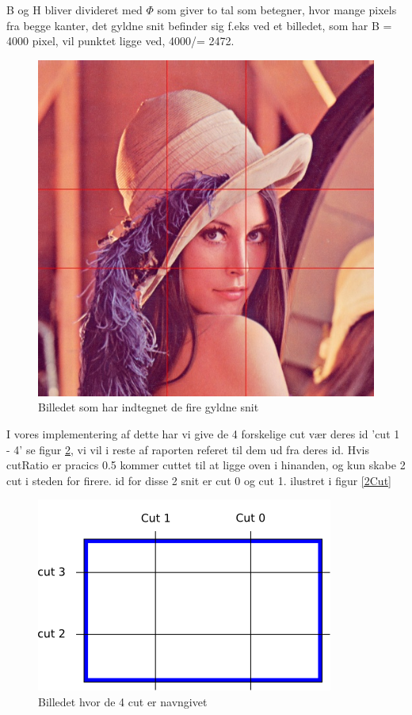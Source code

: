 B og H bliver divideret med $\varPhi$ som giver to tal som betegner, hvor
mange pixels fra begge kanter, det gyldne snit befinder sig f.eks ved et
billedet, som har B = 4000 pixel, vil punktet ligge ved, 4000/\varPhi = 2472.
\begin{figure}[h]
	\begin{center}
		\includegraphics[scale=0.42,angle=0]{afsnit/vores_implementation/billeder/naiv_algoritme/Lenagolden}
	\end{center}
	\caption[]{Billedet som har indtegnet de fire gyldne snit}
	\label{lenasnit2}
\end{figure}

I vores implementering af dette har vi give de 4 forskelige cut vær
deres id 'cut 1 - 4' se figur \ref{cut}, vi vil i reste af raporten
referet til dem ud fra deres id. Hvis cutRatio er pracics 0.5 kommer cuttet til at ligge oven i hinanden,
og kun skabe 2 cut i steden for firere. id for disse 2 snit er cut 0 og
cut 1. ilustret i figur \ref{2Cut}

\begin{figure}[h]
	\begin{center}
		\includegraphics[scale=0.42,angle=0]{afsnit/vores_implementation/billeder/naiv_algoritme/Cut}
	\end{center}
	\caption[]{Billedet hvor de 4 cut er navngivet}
	\label{cut}
\end{figure}



